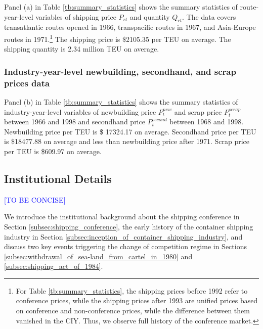 \documentclass[11pt]{article}
\begin{document}
Panel (a) in Table \ref{tb:summary_statistics} shows the summary statistics of route-year-level variables of shipping price $P_{rt}$ and quantity $Q_{rt}$. The data covers transatlantic routes opened in 1966, transpacific routes in 1967, and Asia-Europe routes in 1971.\footnote{For Table \ref{tb:summary_statistics}, the shipping prices before 1992 refer to conference prices, while the shipping prices after 1993 are unified prices based on conference and non-conference prices, while the difference between them vanished in the CIY. Thus, we observe full history of the conference market.} The shipping price is \$2105.35 per TEU on average. The shipping quantity is 2.34 million TEU on average. 

\subsubsection{Industry-year-level newbuilding, secondhand, and scrap prices data}

Panel (b) in Table \ref{tb:summary_statistics} shows the summary statistics of industry-year-level variables of newbuilding price $P_{t}^{new}$ and scrap price $P_{t}^{scrap}$ between 1966 and 1998 and secondhand price $P_{t}^{second}$ between 1968 and 1998. Newbuilding price per TEU is \$ 17324.17 on average. Secondhand price per TEU is \$18477.88 on average and less than newbuilding price after 1971. Scrap price per TEU is \$609.97 on average.

\subsection{Institutional Details}\label{subsec:institutional_details}
\textcolor{blue}{[TO BE CONCISE]}

We introduce the institutional background about the shipping conference in Section \ref{subsec:shipping_conference}, the early history of the container shipping industry in Section \ref{subsec:inception_of_container_shipping_industry}, and discuss two key events triggering the change of competition regime in Sections \ref{subsec:withdrawal_of_sea-land_from_cartel_in_1980} and \ref{subsec:shipping_act_of_1984}.
\end{document}
